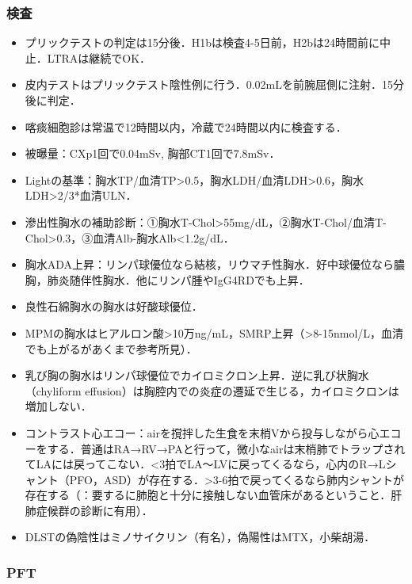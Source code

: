\subsubsection{検査}

\begin{itemize}
\item プリックテストの判定は15分後．H1bは検査4-5日前，H2bは24時間前に中止．LTRAは継続でOK．
\item 皮内テストはプリックテスト陰性例に行う．0.02mLを前腕屈側に注射．15分後に判定．
\item 喀痰細胞診は常温で12時間以内，冷蔵で24時間以内に検査する．
\item 被曝量：CXp1回で0.04mSv, 胸部CT1回で7.8mSv．
\item Lightの基準：胸水TP/血清TP>0.5，胸水LDH/血清LDH>0.6，胸水LDH>2/3*血清ULN．
\item 滲出性胸水の補助診断：①胸水T-Chol>55mg/dL，②胸水T-Chol/血清T-Chol>0.3，③血清Alb-胸水Alb<1.2g/dL．
\item 胸水ADA上昇：リンパ球優位なら結核，リウマチ性胸水．好中球優位なら膿胸，肺炎随伴性胸水．他にリンパ腫やIgG4RDでも上昇．
\item 良性石綿胸水の胸水は好酸球優位．
\item MPMの胸水はヒアルロン酸>10万ng/mL，SMRP上昇（>8-15nmol/L，血清でも上がるがあくまで参考所見）．
\item 乳び胸の胸水はリンパ球優位でカイロミクロン上昇．逆に乳び状胸水（chyliform effusion）は胸腔内での炎症の遷延で生じる，カイロミクロンは増加しない．
\item コントラスト心エコー：airを撹拌した生食を末梢Vから投与しながら心エコーをする．普通はRA→RV→PAと行って，微小なairは末梢肺でトラップされてLAには戻ってこない．<3拍でLA〜LVに戻ってくるなら，心内のR→Lシャント（PFO，ASD）が存在する．>3-6拍で戻ってくるなら肺内シャントが存在する（：要するに肺胞と十分に接触しない血管床があるということ．肝肺症候群の診断に有用）．
\item DLSTの偽陰性はミノサイクリン（有名），偽陽性はMTX，小柴胡湯．
\end{itemize}


\subsubsection{PFT}


